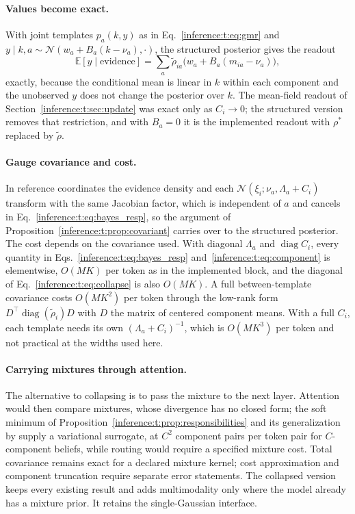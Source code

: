 \documentclass[11pt]{article}
\theoremstyle{definition}
\theoremstyle{remark}
\providecommand{\diag}{\operatorname{diag}}
\providecommand{\E}{\mathbb{E}}
\providecommand{\N}{\mathcal{N}}
\begin{document}
\paragraph{Values become exact.}
With joint templates $p_a(k,y)$ as in Eq.~\eqref{inference:t:eq:gmr} and $y\mid k,a\sim\N(w_a+B_a(k-\nu_a),\cdot)$, the structured posterior gives the readout
\begin{equation}
\E[y\mid\text{evidence}]=\sum_a\tilde\rho_{ia}\bigl(w_a+B_a(m_{ia}-\nu_a)\bigr),
\label{inference:t:eq:structured_readout}
\end{equation}
exactly, because the conditional mean is linear in $k$ within each component and the unobserved $y$ does not change the posterior over $k$. The mean-field readout of Section~\ref{inference:t:sec:update} was exact only as $C_i\to0$; the structured version removes that restriction, and with $B_a=0$ it is the implemented readout with $\rho^{*}$ replaced by $\tilde\rho$.

\paragraph{Gauge covariance and cost.}
In reference coordinates the evidence density and each $\N(\xi_i;\nu_a,\Lambda_a+C_i)$ transform with the same Jacobian factor, which is independent of $a$ and cancels in Eq.~\eqref{inference:t:eq:bayes_resp}, so the argument of Proposition~\ref{inference:t:prop:covariant} carries over to the structured posterior. The cost depends on the covariance used. With diagonal $\Lambda_a$ and $\diag C_i$, every quantity in Eqs.~\eqref{inference:t:eq:bayes_resp} and~\eqref{inference:t:eq:component} is elementwise, $O(MK)$ per token as in the implemented block, and the diagonal of Eq.~\eqref{inference:t:eq:collapse} is also $O(MK)$. A full between-template covariance costs $O(MK^2)$ per token through the low-rank form $D^{\top}\diag(\tilde\rho_i)D$ with $D$ the matrix of centered component means. With a full $C_i$, each template needs its own $(\Lambda_a+C_i)^{-1}$, which is $O(MK^3)$ per token and not practical at the widths used here.

\paragraph{Carrying mixtures through attention.}
The alternative to collapsing is to pass the mixture to the next layer. Attention would then compare mixtures, whose divergence has no closed form; the soft minimum of Proposition~\ref{inference:t:prop:responsibilities} and its generalization by \citep{inference:hershey2007} supply a variational surrogate, at $C^2$ component pairs per token pair for $C$-component beliefs, while routing would require a specified mixture cost. Total covariance remains exact for a declared mixture kernel; cost approximation and component truncation require separate error statements. The collapsed version keeps every existing result and adds multimodality only where the model already has a mixture prior. It retains the single-Gaussian interface.
\end{document}
